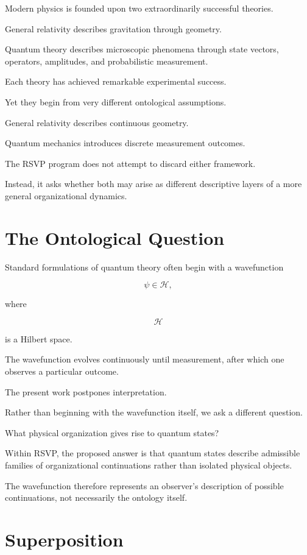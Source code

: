 \documentclass[11pt,oneside]{book}
\numberwithin{equation}{chapter}
\theoremstyle{definition}
\theoremstyle{plain}
\begin{document}
Modern physics is founded upon two extraordinarily successful theories.

General relativity describes gravitation through geometry.

Quantum theory describes microscopic phenomena through state vectors,
operators, amplitudes, and probabilistic measurement.

Each theory has achieved remarkable experimental success.

Yet they begin from very different ontological assumptions.

General relativity describes continuous geometry.

Quantum mechanics introduces discrete measurement outcomes.

The RSVP program does not attempt to discard either framework.

Instead, it asks whether both may arise as different descriptive layers of a
more general organizational dynamics.

\section{The Ontological Question}

Standard formulations of quantum theory often begin with a wavefunction

\[
\psi \in \mathcal H,
\]

where

\[
\mathcal H
\]

is a Hilbert space.

The wavefunction evolves continuously until measurement, after which one
observes a particular outcome.

The present work postpones interpretation.

Rather than beginning with the wavefunction itself, we ask a different
question.

What physical organization gives rise to quantum states?

Within RSVP, the proposed answer is that quantum states describe admissible
families of organizational continuations rather than isolated physical
objects.

The wavefunction therefore represents an observer's description of possible
continuations, not necessarily the ontology itself.

\section{Superposition}
\end{document}
